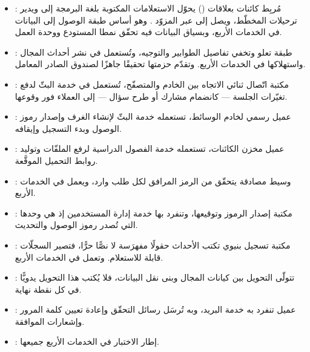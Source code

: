 \begin{itemize}
  \item \textbf{}: مُربِط كائنات بعلاقات () يحوّل الاستعلامات المكتوبة بلغة البرمجة إلى  ويدير ترحيلات المخطّط، ويصل إلى  عبر المزوّد . وهو أساس طبقة الوصول إلى البيانات في الخدمات الأربع، وبسياق البيانات فيه تحقّق نمطا المستودع ووحدة العمل.

  \item \textbf{}: طبقة تعلو  وتخفي تفاصيل الطوابير والتوجيه، وتُستعمل في نشر أحداث المجال واستهلاكها في الخدمات الأربع. وتقدّم حزمتها  تحقيقًا جاهزًا لصندوق الصادر المعامل.

  \item \textbf{}: مكتبة اتّصال ثنائي الاتجاه بين الخادم والمتصفّح، تُستعمل في خدمة البثّ لدفع تغيّرات الجلسة — كانضمام مشارك أو طرح سؤال — إلى العملاء فور وقوعها.

  \item \textbf{}: عميل رسمي لخادم الوسائط، تستعمله خدمة البثّ لإنشاء الغرف وإصدار رموز الوصول وبدء التسجيل وإيقافه.

  \item \textbf{}: عميل مخزن الكائنات، تستعمله خدمة الفصول الدراسية لرفع الملفّات وتوليد روابط التحميل الموقَّعة.

  \item \textbf{}: وسيط مصادقة يتحقّق من الرمز المرافق لكل طلب وارد، ويعمل في الخدمات الأربع.

  \item \textbf{}: مكتبة إصدار الرموز وتوقيعها، وتنفرد بها خدمة إدارة المستخدمين إذ هي وحدها التي تُصدر رموز الوصول والتحديث.

  \item \textbf{}: مكتبة تسجيل بنيوي تكتب الأحداث حقولًا مفهرَسة لا نصًّا حرًّا، فتصير السجلّات قابلة للاستعلام. وتعمل في الخدمات الأربع.

  \item \textbf{}: تتولّى التحويل بين كيانات المجال وبنى نقل البيانات، فلا يُكتب هذا التحويل يدويًّا في كل نقطة نهاية.

  \item \textbf{}: عميل  تنفرد به خدمة البريد، وبه تُرسَل رسائل التحقّق وإعادة تعيين كلمة المرور وإشعارات الموافقة.

  \item \textbf{}: إطار الاختبار في الخدمات الأربع جميعها.
\end{itemize}

